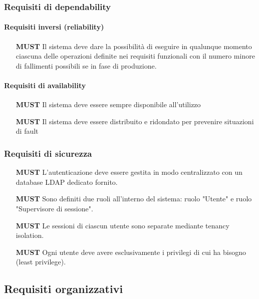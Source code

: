 \documentclass[../main.tex]{subfiles}
\begin{document}
\subsubsection{Requisiti  di  dependability}
\paragraph{Requisiti  inversi  (reliability)}
\begin{itemize}
    \item[\textbf{MUST}] Il sistema deve dare la possibilità di eseguire in qualunque momento ciascuna delle operazioni definite nei requisiti funzionali con il numero minore di fallimenti possibili se in fase di produzione.
\end{itemize}
\paragraph{Requisiti  di  availability}
\begin{itemize}
    \item[\textbf{MUST}] Il sistema deve essere sempre disponibile all'utilizzo
    \item[\textbf{MUST}] Il sistema deve essere distribuito e ridondato per prevenire situazioni di fault
\end{itemize}
\subsubsection{Requisiti  di  sicurezza}
\begin{itemize}
    \item[\textbf{MUST}] L'autenticazione deve essere gestita in modo centralizzato con un database LDAP dedicato fornito.
    \item[\textbf{MUST}] Sono definiti due ruoli all'interno del sistema: ruolo "Utente" e ruolo "Supervisore di sessione". 
    \item[\textbf{MUST}] Le sessioni di ciascun utente sono separate mediante tenancy isolation.
    \item[\textbf{MUST}] Ogni utente deve avere esclusivamente i privilegi di cui ha bisogno (least privilege).
\end{itemize}
\subsection{Requisiti  organizzativi}
\end{document}
